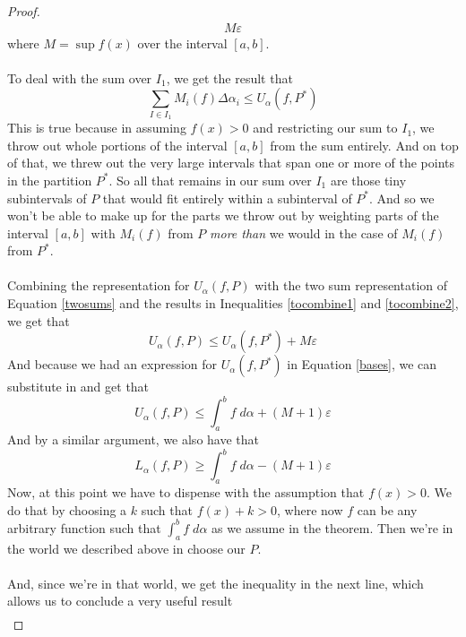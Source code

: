 \documentclass[12pt]{book}
\numberwithin{equation}{section} %
\theoremstyle{plain}
\theoremstyle{definition}
\theoremstyle{remark}
\begin{document}
\begin{proof}
\begin{align}
            M\varepsilon
        \label{tocombine1}
\end{align}
where $M = \sup f(x)$ over the interval $[a,b]$.
\\
\\
To deal with the sum over $I_1$, we get the result that
\begin{equation}
    \label{tocombine2}
    \sum_{I\in I_1} M_i(f) \Delta\alpha_i  \leq U_\alpha(f,P^*)
\end{equation}
This is true because in assuming $f(x)>0$ and restricting our sum to
$I_1$, we throw out whole portions of the interval $[a,b]$ from the sum
entirely. And on top of that, we threw out the very large intervals that
span one or more of the points in the partition $P^*$.  So all that
remains in our sum over $I_1$ are those tiny subintervals of $P$ that
would fit entirely within a subinterval of $P^*$. And so we won't be
able to make up for the parts we throw out by weighting parts of the
interval $[a,b]$ with $M_i(f)$ from $P$ \emph{more than} we would in the
case of $M_i(f)$ from $P^*$.
\\
\\
Combining the representation for $U_\alpha(f,P)$ with the two sum
representation of Equation \ref{twosums} and the results in Inequalities
\ref{tocombine1} and \ref{tocombine2}, we get that
\begin{equation}
    U_\alpha(f,P) \leq U_\alpha(f,P^*) + M\varepsilon
\end{equation}
And because we had an expression for $U_\alpha(f,P^*)$ in Equation
\ref{bases}, we can substitute in and get that
\begin{equation}
    \label{ass1}
    U_\alpha(f,P) \leq \int^b_a f\;d\alpha  + (M+1)\varepsilon
\end{equation}
And by a similar argument, we also have that
\begin{equation}
    \label{ass2}
    L_\alpha(f,P) \geq \int^b_a f\;d\alpha  - (M+1)\varepsilon
\end{equation}
Now, at this point we have to dispense with the assumption that
$f(x)>0$.  We do that by choosing a $k$ such that $f(x) + k >0$, where
now $f$ can be any arbitrary function such that $\int^b_a f\;d\alpha$ as
we assume in the theorem.  Then we're in the world we described above in
choose our $P$.
\\
\\
And, since we're in that world, we get the inequality in the next line,
which allows us to conclude a very useful result
\begin{align*}

\end{align*}
\end{proof}
\end{document}
